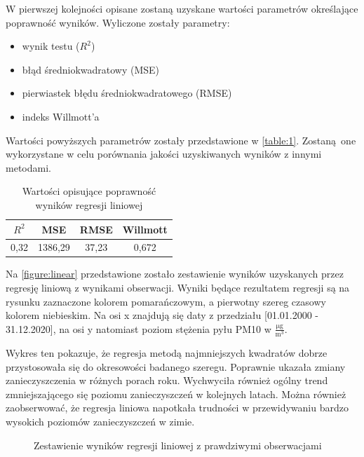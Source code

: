 \documentclass[10pt,a4paper]{article}
\begin{document}
W pierwszej kolejności opisane zostaną uzyskane wartości parametrów określające poprawność wyników. Wyliczone zostały parametry:
\begin{center}
	\begin{itemize}
		\item wynik testu ($R^2$)
		\item błąd średniokwadratowy (MSE)
		\item pierwiastek błędu średniokwadratowego (RMSE)
		\item indeks Willmott'a
	\end{itemize}
\end{center}
Wartości powyższych parametrów zostały przedstawione w \autoref{table:1}. Zostaną one wykorzystane w celu porównania jakości uzyskiwanych wyników z innymi metodami.
\begin{table}[h!]
	\centering
	\begin{tabular}{|c|c|c|c|}
		\hline
		$R^2$ & MSE & RMSE & Willmott \\
		\hline
		0,32 & 1386,29 & 37,23 & 0,672 \\
		\hline
	\end{tabular}
		\caption{Wartości opisujące poprawność wyników regresji liniowej}
		\label{table:1}
\end{table}

Na \autoref{figure:linear} przedstawione zostało zestawienie wyników uzyskanych przez regresję liniową z wynikami obserwacji. Wyniki będące rezultatem regresji są na rysunku zaznaczone kolorem pomarańczowym, a pierwotny szereg czasowy kolorem niebieskim. Na osi x znajdują się daty z przedziału [01.01.2000 - 31.12.2020], na osi y natomiast poziom stężenia pyłu PM10 w $\frac{\si{\micro\gram}}{\si\meter^3}$. 

Wykres ten pokazuje, że regresja metodą najmniejszych kwadratów dobrze przystosowała się do okresowości badanego szeregu. Poprawnie ukazała zmiany zanieczyszczenia w różnych porach roku. Wychwyciła również ogólny trend zmniejszającego się poziomu zanieczyszczeń w kolejnych latach. Można również zaobserwować, że regresja liniowa napotkała trudności w przewidywaniu bardzo wysokich poziomów zanieczyszczeń w zimie. 

\begin{figure}[!ht]
	\centering
	\caption{Zestawienie wyników regresji liniowej z prawdziwymi obserwacjami}
	\label{figure:linear}
\end{figure}
\FloatBarrier
\end{document}
